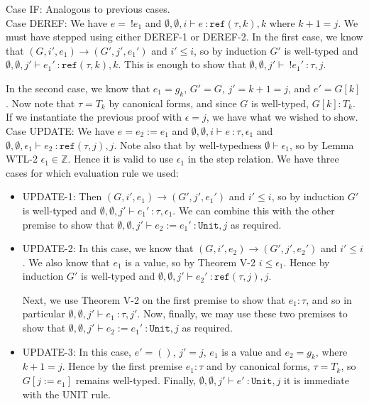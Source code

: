 \documentclass{article}
\newcommand{\Z}{\mathbb{Z}}
\begin{document}
Case IF: Analogous to previous cases.
\\

Case DEREF: We have $e =\ !e_1$ and $\emptyset, \emptyset, i \vdash e\ \colon \texttt{ref}(\tau, k), k$ where $k+1 = j$. We must have stepped using either DEREF-1 or DEREF-2. In the first case, we know that $(G, i', e_1) \rightarrow (G', j', e_1')$ and $i' \leq i$, so by induction $G'$ is well-typed and $\emptyset, \emptyset, j' \vdash e_1'\ \colon \texttt{ref}(\tau, k), k$. This is enough to show that $\emptyset, \emptyset, j' \vdash\ !e_1'\ \colon \tau, j$.

In the second case, we know that $e_1 = g_k$, $G' = G$, $j' = k+1 = j$, and $e' = G[k]$. Now note that $\tau = T_k$ by canonical forms, and since $G$ is well-typed, $G[k] : T_k$. If we instantiate the previous proof with $\epsilon = j$, we have what we wished to show.
\\

Case UPDATE: We have $e = e_2 := e_1$ and $\emptyset, \emptyset, i \vdash e\ \colon \tau, \epsilon_1$ and $\emptyset, \emptyset, \epsilon_1 \vdash e_2\ \colon \texttt{ref}(\tau, j), j$. Note also that by well-typedness $\emptyset \vdash \epsilon_1$, so by Lemma WTL-2 $\epsilon_1 \in \Z$. Hence it is valid to use $\epsilon_1$ in the step relation. We have three cases for which evaluation rule we used:
\begin{itemize}
	\item UPDATE-1: Then $(G, i', e_1) \rightarrow (G', j', e_1')$ and $i' \leq i$, so by induction $G'$ is well-typed and $\emptyset, \emptyset, j' \vdash e_1'\ \colon \tau, \epsilon_1$. We can combine this with the other premise to show that $\emptyset, \emptyset, j' \vdash e_2 := e_1'\ \colon \texttt{Unit}, j$ as required.
	\item UPDATE-2: In this case, we know that $(G, i', e_2) \rightarrow (G', j', e_2')$ and $i' \leq i$. We also know that $e_1$ is a value, so by Theorem V-2 $i \leq \epsilon_1$. Hence by induction $G'$ is well-typed and $\emptyset, \emptyset, j' \vdash e_2'\ \colon \texttt{ref}(\tau, j), j$.
	
	Next, we use Theorem V-2 on the first premise to show that $e_1 : \tau$, and so in particular $\emptyset, \emptyset, j' \vdash e_1\ \colon \tau, j'$. Now, finally, we may use these two premises to show that $\emptyset, \emptyset, j' \vdash e_2 := e_1'\ \colon \texttt{Unit}, j$ as required.
	
	\item UPDATE-3: In this case, $e' = ()$, $j' = j$, $e_1$ is a value and $e_2 = g_k$, where $k+1 = j$. Hence by the first premise $e_1 : \tau$ and by canonical forms, $\tau = T_k$, so $G[j := e_1]$ remains well-typed. Finally, $\emptyset, \emptyset, j' \vdash e'\ \colon \texttt{Unit}, j$ it is immediate with the UNIT rule.
\end{itemize}
\hfill
\end{document}
